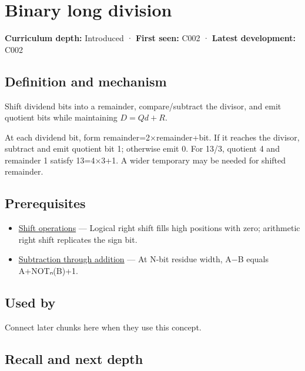\hypertarget{appendix-89985e6a2685}{}
\section{Binary long division}\label{appendix-89985e6a2685-binary-long-division}

\textbf{Curriculum depth:} Introduced · \textbf{First seen:} C002 · \textbf{Latest development:} C002

\subsection{Definition and mechanism}\label{appendix-89985e6a2685-definition-and-mechanism}

Shift dividend bits into a remainder, compare/subtract the divisor, and emit quotient bits while maintaining \(D=Qd+R\).

At each dividend bit, form remainder=2×remainder+bit. If it reaches the divisor, subtract and emit quotient bit 1; otherwise emit 0. For 13/3, quotient 4 and remainder 1 satisfy 13=4×3+1. A wider temporary may be needed for shifted remainder.

\subsection{Prerequisites}\label{appendix-89985e6a2685-prerequisites}

\begin{itemize}
\tightlist
\item
  \hyperref[appendix-73425b25118e]{Shift operations} --- Logical right shift fills high positions with zero; arithmetic right shift replicates the sign bit.
\item
  \hyperref[appendix-1c7df340573e]{Subtraction through addition} --- At N-bit residue width, A−B equals A+NOTₙ(B)+1.
\end{itemize}

\subsection{Used by}\label{appendix-89985e6a2685-used-by}

Connect later chunks here when they use this concept.

\subsection{Recall and next depth}\label{appendix-89985e6a2685-recall-and-next-depth}

